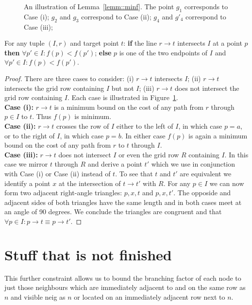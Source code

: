 \begin{figure}[tb]
  \begin{center}
    
  \end{center}
  \caption{An illustration of Lemma~\ref{lemm::minf}. The point $g_1$ corresponds 
to Case (i); $g_2$ and $g_3$ correspond to Case (ii); $g_4$ and $g'_4$ correspond
to Case (iii);}
\label{fig::minf}
\end{figure}

\begin{lemm}
\label{lemm::minf}
For any tuple $(I, r)$ and target point $t$: 
\textbf{if} the line $r \rightarrow t$ intersects $I$ at a point
$p$ \textbf{then} $\forall p' \in I: f(p) < f(p')$;
\textbf{else}
$p$ is one of the two endpoints of $I$ and 
$\forall p' \in I: f(p) < f(p')$.
\end{lemm}
\begin{proof}
There are three cases to consider:
(i) $r \rightarrow t$ intersects $I$; (ii) $r \rightarrow t$ intersects
the grid row containing $I$ but not $I$; (iii) $r \rightarrow t$ does 
not intersect the grid row containing $I$. Each
case is illustrated in Figure~\ref{fig::minf}.
\\
\textbf{Case (i):} $r \rightarrow t$ is a minimum bound on the cost of any
path from $r$ through $p \in I$ to $t$. Thus $f(p)$ is minimum.
\\
\textbf{Case (ii):} $r \rightarrow t$ crosses the row of $I$ 
either to the left of $I$, in which
case $p = a$, or to the right of $I$, in which case $p = b$.
In either case $f(p)$ is again a minimum bound on the cost of any
path from $r$ to $t$ through $I$.
\\
\textbf{Case (iii):} $r \rightarrow t$ does not intersect $I$ 
or even the grid row $R$ containing $I$. In this case we mirror
$t$ through $R$ and derive a point $t'$ which we use in
conjunction with Case (i) or Case (ii) instead of $t$.
To see that $t$ and $t'$ are equivalent we identify 
a point $x$ at the intersection of $t \rightarrow t'$ with $R$. 
For any $p \in I$ we can now form two adjacent right-angle
triangles: $p, x, t$ and $p, x, t'$. The opposide and adjacent 
sides of both triangles have the same length and in both cases 
meet at an angle of 90 degrees. We conclude the triangles are
congruent and that 
$\forall p \in I: p \rightarrow t \equiv p \rightarrow t'$.
\end{proof}

\section{Stuff that is not finished}
This further constraint allows us to bound the branching factor of each
node to just those neighbours which are immediately adjacent to and on
the same row as $n$ and visible neig
as $n$ or located on an immediately adjacent 
row next to $n$.

